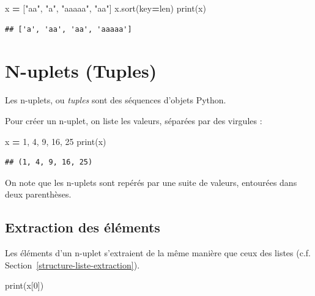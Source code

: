 \documentclass[12pt,]{book}
\newenvironment{Shaded}{\begin{snugshade}}{\end{snugshade}}
\newcommand{\DecValTok}[1]{\textcolor[rgb]{0.00,0.00,0.81}{#1}}
\newcommand{\StringTok}[1]{\textcolor[rgb]{0.31,0.60,0.02}{#1}}
\newcommand{\OperatorTok}[1]{\textcolor[rgb]{0.81,0.36,0.00}{\textbf{#1}}}
\newcommand{\BuiltInTok}[1]{#1}
\newcommand{\NormalTok}[1]{#1}
\numberwithin{equation}{section}
\numberwithin{countremarque}{section}
\begin{document}
\begin{Shaded}
\begin{Highlighting}[]
\NormalTok{x }\OperatorTok{=}\NormalTok{ [}\StringTok{"aa"}\NormalTok{, }\StringTok{"a"}\NormalTok{, }\StringTok{"aaaaa"}\NormalTok{, }\StringTok{"aa"}\NormalTok{]}
\NormalTok{x.sort(key}\OperatorTok{=}\BuiltInTok{len}\NormalTok{)}
\BuiltInTok{print}\NormalTok{(x)}
\end{Highlighting}
\end{Shaded}

\begin{lstlisting}
## ['a', 'aa', 'aa', 'aaaaa']
\end{lstlisting}

\section{N-uplets (Tuples)}\label{n-uplets-tuples}

Les n-uplets, ou \emph{tuples} sont des séquences d'objets Python.

Pour créer un n-uplet, on liste les valeurs, séparées par des virgules :

\begin{Shaded}
\begin{Highlighting}[]
\NormalTok{x }\OperatorTok{=} \DecValTok{1}\NormalTok{, }\DecValTok{4}\NormalTok{, }\DecValTok{9}\NormalTok{, }\DecValTok{16}\NormalTok{, }\DecValTok{25}
\BuiltInTok{print}\NormalTok{(x)}
\end{Highlighting}
\end{Shaded}

\begin{lstlisting}
## (1, 4, 9, 16, 25)
\end{lstlisting}

On note que les n-uplets sont repérés par une suite de valeurs,
entourées dans deux parenthèses.

\subsection{Extraction des éléments}\label{extraction-des-elements}

Les éléments d'un n-uplet s'extraient de la même manière que ceux des
listes (c.f. Section~\ref{structure-liste-extraction}).

\begin{Shaded}
\begin{Highlighting}[]
\BuiltInTok{print}\NormalTok{(x[}\DecValTok{0}\NormalTok{])}
\end{Highlighting}
\end{Shaded}
\end{document}
